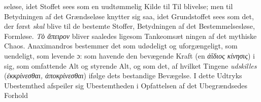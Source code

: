 \documentclass[12pt,a4paper]{book}
\newcommand{\gk}[1]{\textit{#1}}
\begin{document}
seløse, idet Stoffet sees som en uudtømmelig Kilde til Til\-%
blivelse; men til Betydningen af det Grændseløse knytter sig
saa, idet Grundstoffet sees som det, der først \emph{skal} blive til
de bestemte Stoffer, Betydningen af det Bestemmelsesløse,
\setcounter{footnote}{0}
Formløse. \gk{Τὸ ἄπειρον} bliver saaledes ligesom Tankeomsæt\-%
ningen af det mythiske Chaos. Anaximandros bestemmer det
som udødeligt og uforgængeligt, som uendeligt, som levende
ɔ: som havende den bevægende Kraft (en \gk{ἀΐδιος κίνησις}) i sig,
som omfattende Alt og styrende Alt, og som det, af hvilket
Tingene \emph{udskilles} (\gk{ἐκκρίνεσθαι, ἀποκρίνεσθαι}) ifølge dets
bestandige Bevægelse. I dette Udtryks Ubestemthed afspeiler
sig Ubestemtheden i Opfattelsen af det Ubegrændsedes Forhold
\end{document}
